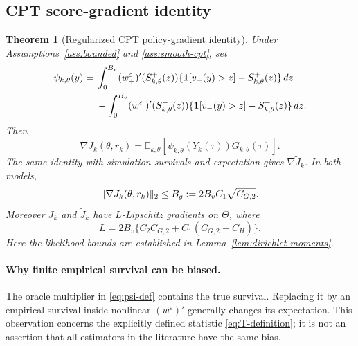 \documentclass[11pt]{article}
\newtheorem{theorem}{Theorem}[section]
\newcommand{\E}{\mathbb E}
\newcommand{\1}{\mathbf 1}
\DeclarePairedDelimiter{\norm}{\lVert}{\rVert}
\newcommand{\eps}{\varepsilon}
\begin{document}
\subsection{CPT score-gradient identity}
\begin{theorem}[Regularized CPT policy-gradient identity]\label{thm:gradient-identity}
Under Assumptions~\ref{ass:bounded} and \ref{ass:smooth-cpt}, set
\begin{align}\label{eq:psi-def}
 \psi_{k,\theta}(y)
 ={}&\int_0^{B_v}(w_+^\eps)'(S_{k,\theta}^+(z))
 \{\1[v_+(y)>z]-S_{k,\theta}^+(z)\}\,dz\notag\\
 &-\int_0^{B_v}(w_-^\eps)'(S_{k,\theta}^-(z))
 \{\1[v_-(y)>z]-S_{k,\theta}^-(z)\}\,dz.
\end{align}
Then
\begin{equation}\label{eq:gradient-identity}
 \nabla J_k(\theta,r_{k})=\E_{k,\theta}[\psi_{k,\theta}(Y_k(\tau))G_{k,\theta}(\tau)].
\end{equation}
The same identity with simulation survivals and expectation gives $\nabla\widetilde J_k$. In both models,
\begin{equation}\label{eq:gradient-bound}
 \norm{\nabla J_k(\theta,r_{k})}_2\le B_g:=2B_vC_1\sqrt{C_{G,2}}.
\end{equation}
Moreover $J_k$ and $\widetilde J_k$ have $L$-Lipschitz gradients on $\Theta$, where
\begin{equation}\label{eq:derived-smoothness}
 L=2B_v\{C_2C_{G,2}+C_1(C_{G,2}+C_H)\}.
\end{equation}
Here the likelihood bounds are established in Lemma~\ref{lem:dirichlet-moments}.
\end{theorem}

\paragraph{Why finite empirical survival can be biased.}
The oracle multiplier in \eqref{eq:psi-def} contains the true survival. Replacing it by an empirical survival inside nonlinear $(w^\eps)'$ generally changes its expectation. This observation concerns the explicitly defined statistic \eqref{eq:T-definition}; it is not an assertion that all estimators in the literature have the same bias.
\end{document}
